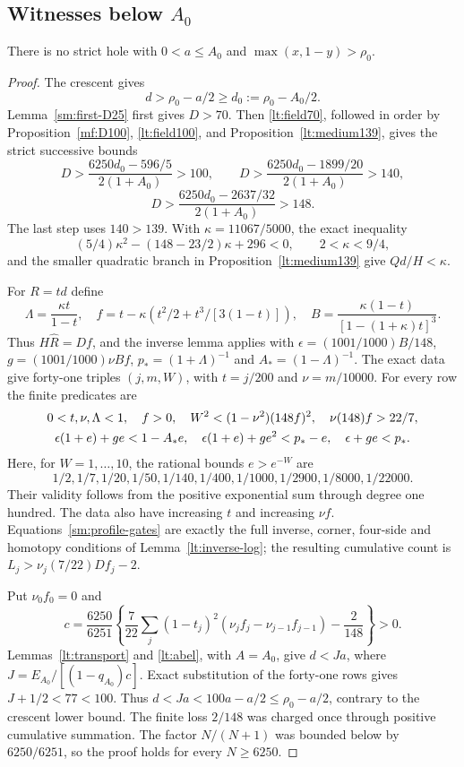 \subsection{Witnesses below $A_0$}

\begin{proposition}\label{sm:fine}
There is no strict hole with $0<a\le A_0$ and
$\max(x,1-y)>\rho_0$.
\end{proposition}
\begin{proof}
The crescent gives
\[
 d>\rho_0-a/2\ge d_0:=\rho_0-A_0/2.
\]
Lemma~\ref{sm:first-D25} first gives $D>70$.
Then \eqref{lt:field70}, followed in order by
Proposition~\ref{mf:D100}, \eqref{lt:field100}, and
Proposition~\ref{lt:medium139}, gives the strict successive bounds
\[
 D>\frac{6250d_0-596/5}{2(1+A_0)}>100,\qquad
 D>\frac{6250d_0-1899/20}{2(1+A_0)}>140,
\]
\[
 D>\frac{6250d_0-2637/32}{2(1+A_0)}>148.
\]
The last step uses $140>139$.
With $\kappa=11067/5000$, the exact inequality
\[
 (5/4)\kappa^2-(148-23/2)\kappa+296<0,\qquad 2<\kappa<9/4,
\]
and the smaller quadratic branch in Proposition~\ref{lt:medium139}
give $Qd/H<\kappa$.

For $R=td$ define
\[
 \Lambda=\frac{\kappa t}{1-t},\quad
 f=t-\kappa\left(t^2/2+t^3/[3(1-t)]\right),\quad
 B=\frac{\kappa(1-t)}{[1-(1+\kappa)t]^3}.
\]
Thus $H\widehat R=Df$, and the inverse lemma applies with
$\epsilon=(1001/1000)B/148$,
$g=(1001/1000)\nu Bf$, $p_*=(1+\Lambda)^{-1}$ and
$A_*=(1-\Lambda)^{-1}$.
The exact data  give forty-one
triples $(j,m,W)$, with $t=j/200$ and $\nu=m/10000$.
For every row the finite predicates are
\begin{gather}
 0<t,\nu,\Lambda<1,\quad f>0,\quad
 W^2<(1-\nu^2)(148f)^2,\quad\nu(148)f>22/7,\notag\\
 \epsilon(1+e)+ge<1-A_*e,\quad
 \epsilon(1+e)+ge^2<p_*-e,\quad\epsilon+ge<p_*.
 \label{sm:profile-gates}
\end{gather}
Here, for $W=1,\ldots,10$, the rational bounds $e>e^{-W}$ are
\[
 1/2, 1/7, 1/20, 1/50, 1/140, 1/400,
 1/1000, 1/2900, 1/8000, 1/22000.
\]
Their validity follows from the positive exponential sum through
degree one hundred. The data also have increasing $t$ and increasing
$\nu f$. Equations~\eqref{sm:profile-gates} are exactly the full
inverse, corner, four-side and homotopy conditions of
Lemma~\ref{lt:inverse-log}; the resulting cumulative count is
$L_j>\nu_j(7/22)Df_j-2$.

Put $\nu_0f_0=0$ and
\[
 c=\frac{6250}{6251}\left\{
 \frac7{22}\sum_j(1-t_j)^2(\nu_jf_j-\nu_{j-1}f_{j-1})-\frac2{148}
 \right\}>0.
\]
Lemmas~\ref{lt:transport} and \ref{lt:abel}, with $A=A_0$, give
$d<Ja$, where $J=E_{A_0}/[(1-q_{A_0})c]$.
Exact substitution of the forty-one rows gives
$J+1/2<77<100$.
Thus $d<Ja<100a-a/2\le\rho_0-a/2$, contrary to the crescent
lower bound. The finite loss $2/148$ was charged once through
positive cumulative summation. The factor $N/(N+1)$ was bounded
below by $6250/6251$, so the proof holds for every $N\ge6250$.
\end{proof}

